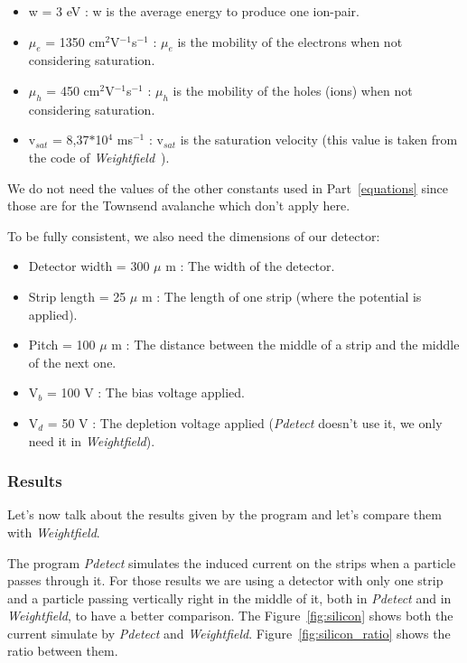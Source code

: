 \documentclass[11pt]{article}
\begin{document}
				\begin{itemize}

					\item w = 3 eV : w is the average energy to produce one ion-pair.
					\item $\mu_e$ = 1350 cm$^2$V$^{-1}$s$^{-1}$ : $\mu_e$ is the mobility of the electrons
						when not considering saturation.
					\item $\mu_h$ = 450 cm$^2$V$^{-1}$s$^{-1}$ : $\mu_h$ is the mobility of the holes (ions)
						when not considering saturation.
					\item v$_{sat}$ = 8,37$*$10$^{4}$ ms$^{-1}$ : v$_{sat}$ is the saturation velocity
							(this value is taken from the code of \textit{Weightfield}~\cite{Cenna2015}).

				\end{itemize}

				We do not need the values of the other constants used in Part~\ref{equations} since
				those are for the Townsend avalanche which don't apply here.

				To be fully consistent, we also need the dimensions of our detector:

				\begin{itemize}

					\item Detector width = 300 $\mu$ m : The width of the detector.
					\item Strip length = 25 $\mu$ m : The length of one strip (where the potential is
						applied).
					\item Pitch = 100 $\mu$ m : The distance between the middle of a strip and the middle
						of the next one.
					\item V$_b$ = 100 V : The bias voltage applied.
					\item V$_d$ = 50 V : The depletion voltage applied (\textit{Pdetect} doesn't use it, we only
						need it in \textit{Weightfield}).

				\end{itemize}

			\subsubsection*{Results}

				Let's now talk about the results given by the program and let's compare them with \textit{Weightfield}.

				The program \textit{Pdetect} simulates the induced current on the strips when a particle passes through it.
				For those results we are using a detector with only one strip and a particle passing vertically right in
				the middle of it, both in \textit{Pdetect} and in \textit{Weightfield}, to have a better comparison. The
				Figure~\ref{fig:silicon} shows both the current simulate by \textit{Pdetect} and \textit{Weightfield}.
				Figure~\ref{fig:silicon_ratio} shows the ratio between them.
\end{document}
